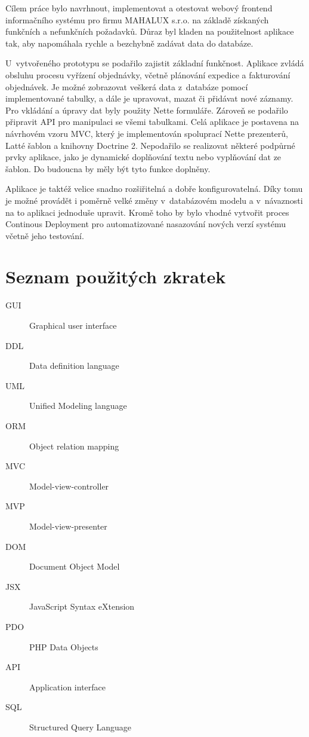 \documentclass[thesis=B,czech]{FITthesis}[2012/06/26]
\begin{document}
\begin{conclusion}
	Cílem práce bylo navrhnout, implementovat a otestovat webový frontend informačního systému pro firmu MAHALUX s.r.o. na základě získaných funkčních a nefunkčních požadavků. Důraz byl kladen na použitelnost aplikace tak, aby napomáhala rychle a bezchybně zadávat data do databáze.
	
	U~vytvořeného prototypu se podařilo zajistit základní funkčnost. Aplikace zvládá obsluhu procesu vyřízení objednávky, včetně plánování expedice a fakturování objednávek. Je možné zobrazovat veškerá data z~databáze pomocí implementované tabulky, a dále je upravovat, mazat či přidávat nové záznamy. Pro vkládání a úpravy dat byly použity Nette formuláře. Zároveň se podařilo připravit API pro manipulaci se všemi tabulkami. Celá aplikace je postavena na návrhovém vzoru MVC, který je implementován spoluprací Nette prezenterů, Latté šablon a knihovny Doctrine 2. Nepodařilo se realizovat některé podpůrné prvky aplikace, jako je dynamické doplňování textu nebo vyplňování dat ze šablon. Do budoucna by měly být tyto funkce doplněny. 
	
	Aplikace je taktéž velice snadno rozšiřitelná a dobře konfigurovatelná. Díky tomu je možné provádět i poměrně velké změny v~databázovém modelu a v~návaznosti na to aplikaci jednoduše upravit. Kromě toho by bylo vhodné vytvořit proces Continous Deployment pro automatizované nasazování nových verzí systému včetně jeho testování.
\end{conclusion}






\appendix

\chapter{Seznam použitých zkratek}
\begin{description}
	\item[GUI] Graphical user interface
	\item[DDL] Data definition language
	\item[UML] Unified Modeling language
	\item[ORM] Object relation mapping
	\item[MVC] Model-view-controller
	\item[MVP] Model-view-presenter
	\item[DOM] Document Object Model
	\item[JSX] JavaScript Syntax eXtension
	\item[PDO] PHP Data Objects
	\item[API] Application interface
	\item[SQL] Structured Query Language
\end{description}
\end{document}
